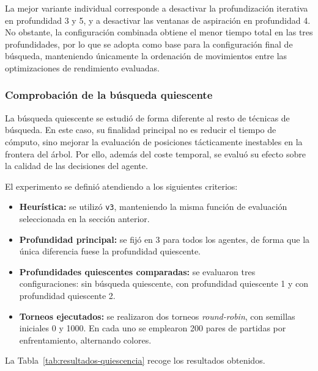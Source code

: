 La mejor variante individual corresponde a desactivar la profundización iterativa en profundidad 3 y 5, y a desactivar las ventanas de aspiración en profundidad 4. No obstante, la configuración combinada obtiene el menor tiempo total en las tres profundidades, por lo que se adopta como base para la configuración final de búsqueda, manteniendo únicamente la ordenación de movimientos entre las optimizaciones de rendimiento evaluadas.


\subsubsection{Comprobación de la búsqueda quiescente}

La búsqueda quiescente se estudió de forma diferente al resto de técnicas de búsqueda. En este caso, su finalidad principal no es reducir el tiempo de cómputo, sino mejorar la evaluación de posiciones tácticamente inestables en la frontera del árbol. Por ello, además del coste temporal, se evaluó su efecto sobre la calidad de las decisiones del agente.

El experimento se definió atendiendo a los siguientes criterios:

\begin{itemize}
    \item \textbf{Heurística:} se utilizó \texttt{v3}, manteniendo la misma función de evaluación seleccionada en la sección anterior.

    \item \textbf{Profundidad principal:} se fijó en 3 para todos los agentes, de forma que la única diferencia fuese la profundidad quiescente.

    \item \textbf{Profundidades quiescentes comparadas:} se evaluaron tres configuraciones: sin búsqueda quiescente, con profundidad quiescente 1 y con profundidad quiescente 2.

    \item \textbf{Torneos ejecutados:} se realizaron dos torneos \textit{round-robin}, con semillas iniciales 0 y 1000. En cada uno se emplearon 200 pares de partidas por enfrentamiento, alternando colores.
\end{itemize}

La Tabla~\ref{tab:resultados-quiescencia} recoge los resultados obtenidos.

